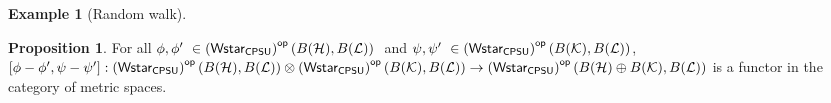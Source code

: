 \documentclass[10pt,a4paper]{amsart}
\theoremstyle{definition}
\theoremstyle{definition}
\newtheorem{example}[definition]{Example}
\theoremstyle{definition}
\theoremstyle{definition}
\newtheorem{proposition}[definition]{Proposition}
\theoremstyle{definition}
\theoremstyle{definition}
\begin{document}
\begin{example}[Random walk]

\begin{comment}

\begin{proposition}
  The category $\WstarCPSUop$ is $\catMet$-enriched and the bifunctor $\bar{\otimes} :  \WstarCPSUop \otimes \WstarCPSUop\to \WstarCPSUop$ is $\mathsf{Met}$-enriched as well.
\end{proposition}


\begin{proof}
  Similarly to  \cite[ Proof of proposition 4.1]{dahlqvist2023syntactic}, in order to prove that $\WstarCPSUop$ is $\catMet$-enriched, it suffices to establish that for normal completely positive subunital maps $\phi: B(\mathcal{H_1}) \rightarrow B(\mathcal{H_2})$  and $\psi: B(\mathcal{K_1}) \rightarrow B(\mathcal{K_2})$, $\cbnorm{\phi \cdot \psi} \leq \phi$ and  $\cbnorm{\phi \cdot \psi} \leq \psi$. This follows directly from Lemma \ref{lem:cb_comp_submult} and the fact that all subunital maps are contractive.
Next, regarding $\bar{\otimes}$, the inequations $\cbnorm{\phi \, \bar{\otimes} \id}  \leq \cbnorm{\phi}$ and  $ \cbnorm{\id \, \bar{\otimes}  \phi} \leq \cbnorm{\phi}$ are  sufficient conditions to prove the second part of the proposition. There inequations follow form Propositions \ref{prop:eqs_id_cb} and \ref{prop:dirsum_cb}.
\end{proof}

\end{comment}



\begin{proposition}
  For all $\phi, \phi' \in \WstarCPSUop(B(\mathcal{H}),B(\mathcal{L}))  $ and $\psi, \psi' \in \WstarCPSUop(B(\mathcal{K}),B(\mathcal{L})) $, $[\phi-\phi',\psi-\psi']:\left(\mathsf{Wstar_{CPSU}}\right)^{\mathsf{op}}(B(\mathcal{H}),B(\mathcal{L})) \otimes \left(\mathsf{Wstar_{CPSU}}\right)^{\mathsf{op}}(B(\mathcal{K}),B(\mathcal{L})) \rightarrow \left(\mathsf{Wstar_{CPSU}}\right)^{\mathsf{op}}(B(\mathcal{H}) \oplus B(\mathcal{K}), B(\mathcal{L})) $ is a functor in the category of metric spaces.
\end{proposition}
  

\end{example}
\end{document}
